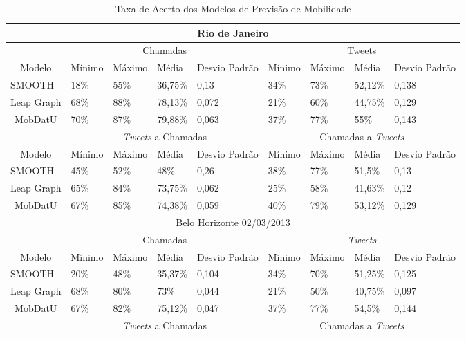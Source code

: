 \documentclass[10pt, a4paper, onecolumn, conference, compsocconf]{IEEEtran}
\begin{document}
\begin{table}[httt!]
\centering
\caption{Taxa de Acerto dos Modelos de Previsão de Mobilidade}
\label{tab:taxa} 
\begin{tabular}{|c|p{1.0cm}|p{1.0cm}|p{1.0cm}|p{1.0cm}|p{1.0cm}|p{1.0cm}|p{1.0cm}|p{1.0cm}|} 
\cline{1-9} 
\multicolumn{9}{|c|}{Rio de Janeiro} \\ \hline
& \multicolumn{4}{|c|}{Chamadas} & \multicolumn{4}{|c|}{Tweets}  \\
\cline{2-9} 
Modelo & Mínimo & Máximo & Média & Desvio Padrão & Mínimo & Máximo & Média & Desvio Padrão\\
\hline
\multicolumn{1}{|l|}{SMOOTH} & 18\% & 55\% & 36,75\% & 0,13 & 34\% & 73\% & 52,12\% & 0,138 \\
\multicolumn{1}{|l|}{Leap Graph} & 68\% & 88\% & 78,13\% & 0,072 & 21\% & 60\% & 44,75\% & 0,129\\
\multicolumn{1}{|1|}{MobDatU} & 70\% & 87\% & 79,88\% & 0,063 & 37\% & 77\% & 55\% & 0,143\\ 
\cline{1-9} 
& \multicolumn{4}{|c|}{\textit{Tweets} a Chamadas} & \multicolumn{4}{|c|}{Chamadas a \textit{Tweets}} \\
\cline{2-9} 
Modelo & Mínimo & Máximo & Média & Desvio Padrão & Mínimo & Máximo & Média & Desvio Padrão\\
\hline
\multicolumn{1}{|l|}{SMOOTH} & 45\% & 52\% & 48\% & 0,26 & 38\% & 77\% & 51,5\% & 0,13\\
\multicolumn{1}{|l|}{Leap Graph} & 65\% & 84\% & 73,75\% & 0,062 & 25\% & 58\% & 41,63\% & 0,12\\
\multicolumn{1}{|1|}{MobDatU} & 67\% & 85\% & 74,38\% & 0,059 & 40\% & 79\% & 53,12\% & 0,129\\ 
\cline{1-9}
\hline
\multicolumn{9}{|c|}{Belo Horizonte 02/03/2013} \\ \hline
& \multicolumn{4}{|c|}{Chamadas} & \multicolumn{4}{|c|}{\textit{Tweets}}  \\
\cline{2-9} 
Modelo & Mínimo & Máximo & Média & Desvio Padrão & Mínimo & Máximo & Média & Desvio Padrão\\
\hline
\multicolumn{1}{|l|}{SMOOTH} & 20\% & 48\% & 35,37\% & 0,104 & 34\% & 70\% & 51,25\% & 0,125 \\
\multicolumn{1}{|l|}{Leap Graph} & 68\% & 80\% & 73\% & 0,044 & 21\% & 50\% & 40,75\% & 0,097 \\
\multicolumn{1}{|1|}{MobDatU} & 67\% & 82\% & 75,12\% & 0,047 & 37\% & 77\% & 54,5\% & 0,144\\ 
\cline{1-9} 
& \multicolumn{4}{|c|}{\textit{Tweets} a Chamadas} & \multicolumn{4}{|c|}{Chamadas a \textit{Tweets}} \\

\end{tabular}
\end{table}
\end{document}
